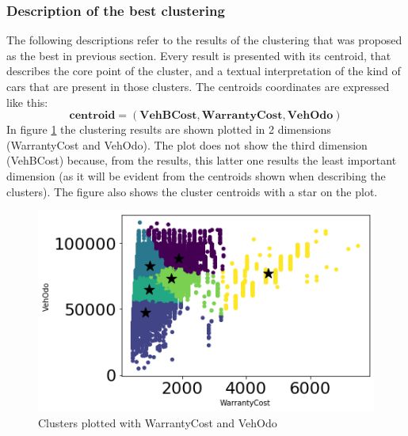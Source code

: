 \documentclass{article}
\begin{document}
\subsubsection{Description of the best clustering}
\label{sec:cluster}
The following descriptions refer to the results of the clustering that was proposed as the best in previous section. Every result is presented with its centroid, that describes the core point of the cluster, and a textual interpretation of the kind of cars that are present in those clusters. 
The centroids coordinates are expressed like this:  
$$ \mathbf{centroid} = (\mathbf{VehBCost}, \mathbf{WarrantyCost}, \mathbf{VehOdo}) $$
In figure \ref{fig:centroid} the clustering results are shown plotted in 2 dimensions (WarrantyCost and VehOdo). The plot does not show the third dimension (VehBCost) because, from the results, this latter one results the least important dimension (as it will be evident from the centroids shown when describing the clusters). The figure also shows the cluster centroids with a star on the plot. 

\begin{figure}[H]
    \centering
	\includegraphics[width=.8\textwidth, keepaspectratio]{centroid}
	\caption{{Clusters plotted with WarrantyCost and VehOdo}}
	\label{fig:centroid}
\end{figure}
\end{document}
